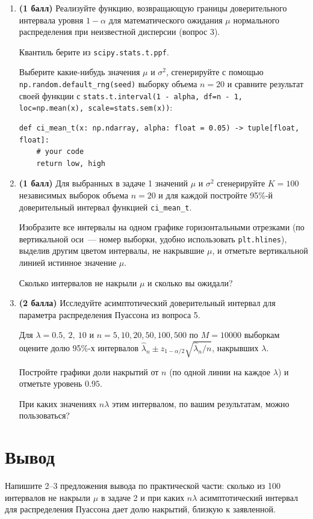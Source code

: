 \documentclass[a4paper,12pt]{article}
\newcommand{\pts}[1]{\textbf{(#1)}}
\begin{document}
\begin{enumerate}
  \item \pts{1 балл} Реализуйте функцию, возвращающую границы доверительного интервала уровня $1-\alpha$ для математического ожидания $\mu$ нормального распределения при неизвестной дисперсии (вопрос 3).

  Квантиль берите из \lstinline|scipy.stats.t.ppf|.

  Выберите какие-нибудь значения $\mu$ и $\sigma^2$, сгенерируйте с помощью \lstinline|np.random.default_rng(seed)| выборку объема $n=20$ и сравните результат своей функции с \lstinline|stats.t.interval(1 - alpha, df=n - 1, loc=np.mean(x), scale=stats.sem(x))|:
\begin{lstlisting}
def ci_mean_t(x: np.ndarray, alpha: float = 0.05) -> tuple[float, float]:
    # your code
    return low, high
\end{lstlisting}

  \item \pts{1 балл} Для выбранных в задаче 1 значений $\mu$ и $\sigma^2$ сгенерируйте $K=100$ независимых выборок объема $n=20$ и для каждой постройте 95\%-й доверительный интервал функцией \lstinline|ci_mean_t|.

  Изобразите все интервалы на одном графике горизонтальными отрезками (по вертикальной оси~--- номер выборки, удобно использовать \lstinline|plt.hlines|), выделив другим цветом интервалы, не накрывшие $\mu$, и отметьте вертикальной линией истинное значение $\mu$.

  Сколько интервалов не накрыли $\mu$ и сколько вы ожидали?

  \item \pts{2 балла} Исследуйте асимптотический доверительный интервал для параметра распределения Пуассона из вопроса 5.

  Для $\lambda = 0.5,\ 2,\ 10$ и $n=5,10,20,50,100,500$ по $M=10000$ выборкам оцените долю 95\%-х интервалов $\hat\lambda_n\pm z_{1-\alpha/2}\sqrt{\hat\lambda_n/n}$, накрывших $\lambda$.

  Постройте графики доли накрытий от $n$ (по одной линии на каждое $\lambda$) и отметьте уровень $0.95$.

  При каких значениях $n\lambda$ этим интервалом, по вашим результатам, можно пользоваться?

\end{enumerate}

\section*{Вывод}

Напишите 2--3 предложения вывода по практической части: сколько из 100 интервалов не накрыли $\mu$ в задаче 2 и при каких $n\lambda$ асимптотический интервал для распределения Пуассона дает долю накрытий, близкую к заявленной.
\end{document}
